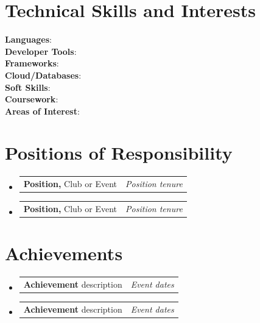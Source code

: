 \documentclass[a4paper,11pt]{article}
\makeatletter
\newcommand{\resumePOR}[3]{
\vspace{0.5mm}\item
    \begin{tabular*}{0.97\textwidth}[t]{l@{\extracolsep{\fill}}r}
        \textbf{#1}\hspace{0.3mm}#2 & \textit{\small{#3}} 
    \end{tabular*}
    \vspace{-2mm}
}
\newcommand{\resumeSubHeadingListStart}{\begin{itemize}[leftmargin=*,labelsep=0mm]}
\newcommand{\resumeSubHeadingListEnd}{\end{itemize}\vspace{2mm}}
\makeatother
\begin{document}
\section{\textbf{Technical Skills and Interests}}
 \begin{itemize}[leftmargin=0.05in, label={}]
    \small{\item{
     \textbf{Languages}{: } \\
     \textbf{Developer Tools}{: } \\
     \textbf{Frameworks}{: } \\
     \textbf{Cloud/Databases}{: } \\
     \textbf{Soft Skills}{: } \\
     \textbf{Coursework}{: } \\
     \textbf{Areas of Interest}{: } \\
    }}
 \end{itemize}
 \vspace{-16pt}



\section{\textbf{Positions of Responsibility}}
\vspace{-0.4mm}
\resumeSubHeadingListStart
\resumePOR{Position, } %
    {Club or Event} %
    {Position tenure} %
\resumePOR{Position, } %
    {Club or Event} %
    {Position tenure} %
\resumeSubHeadingListEnd
\vspace{-5mm}




\section{\textbf{Achievements}}
\vspace{-0.4mm}
\resumeSubHeadingListStart
\resumePOR{Achievement } %
    {description} %
    {Event dates} %
    
\resumePOR{Achievement } %
    {description} %
    {Event dates} %
\resumeSubHeadingListEnd
\vspace{-5mm}
\setlength{\footskip}{4.08003pt}


\end{document}
